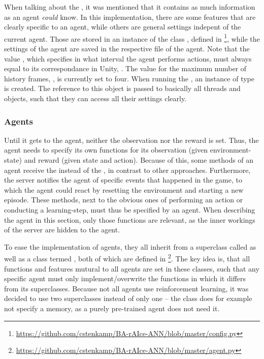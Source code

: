 When talking about the , it was mentioned that it contains as much information as an agent \textit{could} know. In this implementation, there are some features that are clearly specific to an agent, while others are general settings indepent of the current agent. Those are stored in an instance of the class , defined in \footnote{\url{https://github.com/cstenkamp/BA-rAIce-ANN/blob/master/config.py}}, while the settings of the agent are saved in the respective file of the agent. Note that the value , which specifies in what interval the agent performs actions, must always equal to its correspondance in Unity, . The value for the maximum number of history frames, , is currently set to four. When running the , an instance  of type  is created. The reference to this object is passed to basically all threads and objects, such that they can access all their settings clearly.


\subsubsection{Agents}

Until it gets to the agent, neither the observation nor the reward is set. Thus, the agent needs to specify its own functions for its observation (given environment-state) and reward (given state and action). Because of this, some methods of an agent receive the  instead of the , in contrast to other approaches. Furthermore, the server notifies the agent of specific events that happened in the game, to which the agent could react by resetting the environment and starting a new episode. These methods, next to the obvious ones of performing an action or conducting a learning-step, must thus be specified by an agent. When describing the agent in this section, only those functions are relevant, as the inner workings of the server are hidden to the agent.

To ease the implementation of agents, they all inherit from a superclass called  as well as a class termed , both of which are defined in \footnote{\url{https://github.com/cstenkamp/BA-rAIce-ANN/blob/master/agent.py}}. The key idea is, that all functions and features mutural to all agents are set in these classes, such that any specific agent must only implement/overwrite the functions in which it differs from its superclasses. Because not all agents use reinforcement learning, it was decided to use two superclasses instead of only one -- the class  does for example not specify a memory, as a purely pre-trained agent does not need it.

